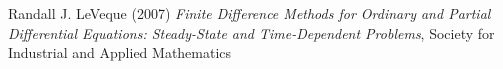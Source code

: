 \documentclass{article}
\begin{document}
\begin{thebibliography}{9}
Randall J. LeVeque (2007) \emph{Finite Difference Methods for Ordinary and Partial Differential Equations:
Steady-State and Time-Dependent Problems}, Society for Industrial and Applied Mathematics 
\end{thebibliography}
\end{document}
